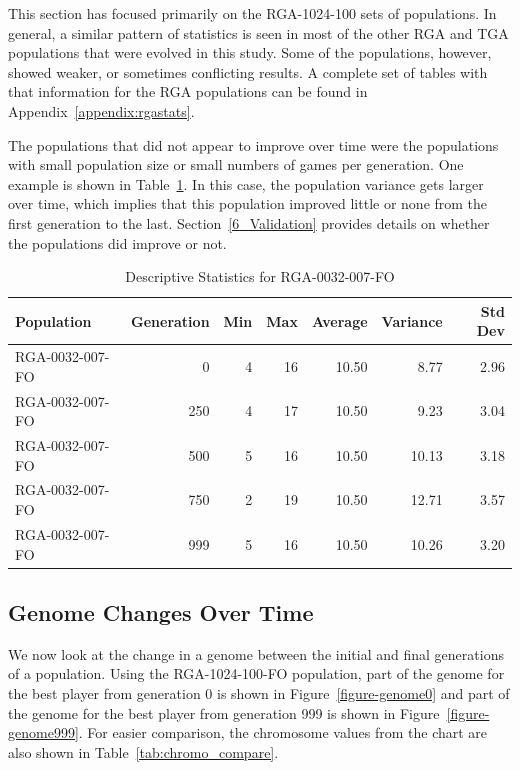 This section has focused primarily on the RGA-1024-100 sets of populations. In
general, a similar pattern of statistics is seen in most of the other RGA and
TGA populations that were evolved in this study. Some of the populations,
however, showed weaker, or sometimes conflicting results. A complete set of
tables with that information for the RGA populations can be found in
Appendix~\ref{appendix:rgastats}.

The populations that did not appear to improve over time were the populations
with small population size or small numbers of games per generation. One example
is shown in Table~\ref{tab:6_RGA-0032-007-FO}. In this case, the population
variance gets larger over time, which implies that this population improved
little or none from the first generation to the last. Section~\ref{6_Validation}
provides details on whether the populations did improve or not.

\begin{table}[htbp]
  \centering
  \caption[RGA-0032-007-FO Statistics]{Descriptive Statistics for RGA-0032-007-FO}
    \begin{tabular}{lrrrrrr}
    \toprule
    Population &  Generation & Min    & Max    & Average & Variance & Std Dev \\
    \midrule
    RGA-0032-007-FO & 0      & 4      & 16     & 10.50  & 8.77   & 2.96 \\
    RGA-0032-007-FO & 250    & 4      & 17     & 10.50  & 9.23   & 3.04 \\
    RGA-0032-007-FO & 500    & 5      & 16     & 10.50  & 10.13  & 3.18 \\
    RGA-0032-007-FO & 750    & 2      & 19     & 10.50  & 12.71  & 3.57 \\
    RGA-0032-007-FO & 999    & 5      & 16     & 10.50  & 10.26  & 3.20 \\
    \bottomrule
    \end{tabular}
  \label{tab:6_RGA-0032-007-FO}%
\end{table}%

\subsection{Genome Changes Over Time}

We now look at the change in a genome between the initial and final
generations of a population. Using the RGA-1024-100-FO population, part of
the genome for the best player from generation 0 is shown in
Figure~\ref{figure-genome0} and part of the genome for the best player from
generation 999 is shown in Figure~\ref{figure-genome999}. For easier comparison,
the chromosome values from the chart are also shown in
Table~\ref{tab:chromo_compare}.

